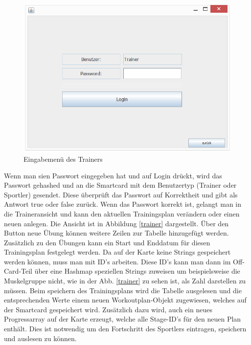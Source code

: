 \begin{figure}[h]
\includegraphics[width=1\hsize]{./images/Login.png}
\caption{Eingabemenü des Trainers}
\label{login}
\end{figure}
\newpage
Wenn man sien Passwort eingegeben hat und auf Login drückt, wird das Passwort gehashed und an die Smartcard mit dem Benutzertyp (Trainer oder Sportler) gesendet. Diese überprüft das Passwort auf Korrektheit und gibt als Antwort true oder false zurück. Wenn das Passwort korrekt ist, gelangt man in die Traineransicht und kann den aktuellen Trainingsplan verändern oder einen neuen anlegen. Die Ansicht ist in Abbildung \ref{trainer} dargestellt. Über den Button neue Übung können weitere Zeilen zur Tabelle hinzugefügt werden. Zusätzlich zu den Übungen kann ein Start und Enddatum für diesen Trainingsplan festgelegt werden. Da auf der Karte keine Strings gespeichert werden können, muss man mit ID's arbeiten. Diese ID's kann man dann im Off-Card-Teil über eine Hashmap speziellen Strings zuweisen um beispielsweise die Muskelgruppe nicht, wie in der Abb. \ref{trainer} zu sehen ist, als Zahl darstellen zu müssen. Beim speichern des Trainingsplans wird die Tabelle ausgelesen und die entsprechenden Werte einem neuen Workoutplan-Objekt zugewiesen, welches auf der Smartcard gespeichert wird. Zusätzlich dazu wird, auch ein neues Progressarray auf der Karte erzeugt, welche alle Stage-ID's für den neuen Plan enthält. Dies ist notwendig um den Fortschritt des Sportlers eintragen, speichern und auslesen zu können.

